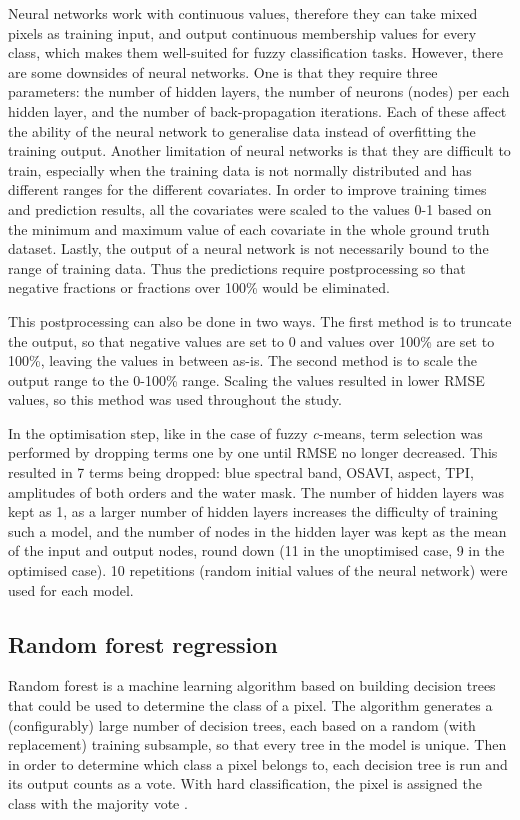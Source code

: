\documentclass[a4paper,10pt]{book}
\begin{document}
Neural networks work with continuous values, therefore they can take mixed pixels as training input, and output continuous membership values for every class, which makes them well-suited for fuzzy classification tasks. However, there are some downsides of neural networks. One is that they require three parameters: the number of hidden layers, the number of neurons (nodes) per each hidden layer, and the number of back-propagation iterations. Each of these affect the ability of the neural network to generalise data instead of overfitting the training output. Another limitation of neural networks is that they are difficult to train, especially when the training data is not normally distributed and has different ranges for the different covariates. In order to improve training times and prediction results, all the covariates were scaled to the values 0-1 based on the minimum and maximum value of each covariate in the whole ground truth dataset. Lastly, the output of a neural network is not necessarily bound to the range of training data. Thus the predictions require postprocessing so that negative fractions or fractions over 100\% would be eliminated.

This postprocessing can also be done in two ways. The first method is to truncate the output, so that negative values are set to 0 and values over 100\% are set to 100\%, leaving the values in between as-is. The second method is to scale the output range to the 0-100\% range. Scaling the values resulted in lower RMSE values, so this method was used throughout the study.

In the optimisation step, like in the case of fuzzy \textit{c}-means, term selection was performed by dropping terms one by one until RMSE no longer decreased. This resulted in 7 terms being dropped: blue spectral band, OSAVI, aspect, TPI, amplitudes of both orders and the water mask. The number of hidden layers was kept as 1, as a larger number of hidden layers increases the difficulty of training such a model, and the number of nodes in the hidden layer was kept as the mean of the input and output nodes, round down (11 in the unoptimised case, 9 in the optimised case). 10 repetitions (random initial values of the neural network) were used for each model.

\subsection{Random forest regression}

Random forest is a machine learning algorithm based on building decision trees that could be used to determine the class of a pixel. The algorithm generates a (configurably) large number of decision trees, each based on a random (with replacement) training subsample, so that every tree in the model is unique. Then in order to determine which class a pixel belongs to, each decision tree is run and its output counts as a vote. With hard classification, the pixel is assigned the class with the majority vote \citep{walton2008subpixelrf}.
\end{document}
